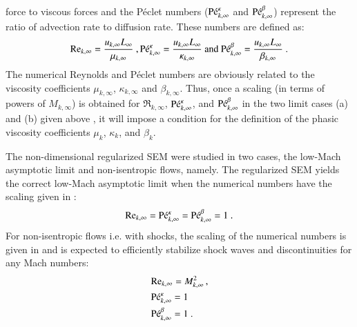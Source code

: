 \documentclass[preprint,10pt]{elsarticle}
\begin{document}
\begin{enumerate}
force to viscous forces and 
the P\'eclet numbers ($\textrm{P\'e}_{k,\infty}^\kappa$ and $\textrm{P\'e}_{k,\infty}^\beta$) represent the ratio of advection rate to diffusion rate. These numbers are defined as:
%
\begin{equation}
\label{eq:ref_numb}
\textrm{Re}_{k,\infty} = \frac{u_{k,\infty} L_\infty}{\mu_{k,\infty}} \ ,
\textrm{P\'e}_{k,\infty}^\kappa = \frac{u_{k,\infty} L_\infty}{\kappa_{k,\infty}} \text{ and }
\textrm{P\'e}_{k,\infty}^\beta = \frac{u_{k,\infty} L_\infty}{\beta_{k,\infty}} \ .
\end{equation}
%
The numerical Reynolds and P\'eclet numbers are obviously related to the 
viscosity coefficients $\mu_{k,\infty}$, $\kappa_{k,\infty}$ and $\beta_{k,\infty}$. Thus, once a scaling (in terms of powers of $M_{k,\infty}$) 
is obtained for $\Re_{k,\infty}$, $\textrm{P\'e}_{k,\infty}^\kappa$, and $\textrm{P\'e}_{k,\infty}^\beta$ in the two limit cases (a) and (b) given above , it will 
impose a condition for the definition of the phasic viscosity coefficients $\mu_k$, $\kappa_k$, and $\beta_k$. 
\end{enumerate} 
The non-dimensional regularized SEM \cite{Marco_paper_sem} were studied in two cases, the low-Mach asymptotic limit and non-isentropic flows, namely. The regularized 
SEM yields the correct 
low-Mach asymptotic limit when the numerical numbers have the scaling given in :
%
\begin{equation}\label{eq:isent-flow-num-nb}
\textrm{Re}_{k,\infty} = \textrm{P\'e}_{k,\infty}^\kappa = \textrm{P\'e}_{k,\infty}^\beta =1 \ .
\end{equation}
%
For non-isentropic flows i.e. with shocks, the scaling of the numerical numbers is given in  and is expected to efficiently 
stabilize shock waves and discontinuities for any Mach numbers:
%
\begin{align}\label{eq:non-isent-flow-num-nb}
&\Re_{k,\infty} = M_{k,\infty}^2 \,, \nonumber \\ 
& \Pe_{k,\infty}^\kappa = 
1 \\ %
&\Pe_{k,\infty}^\beta = 1 \ . \nonumber
\end{align}
\end{document}
